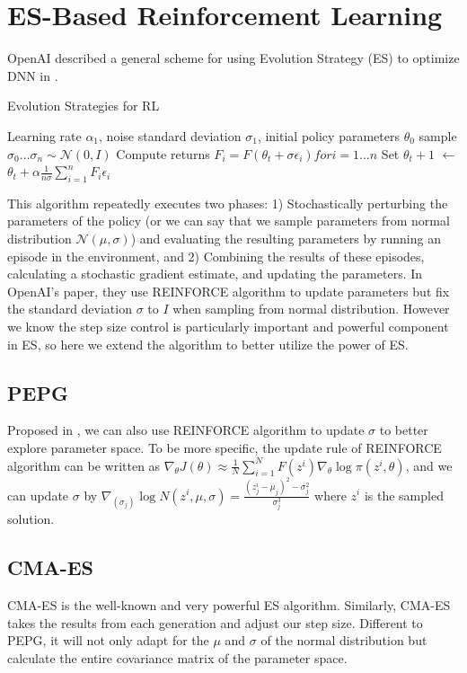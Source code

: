 \documentclass[a4paper]{article}
\newcommand*\Let[2]{\State #1 $\gets$ #2}
\begin{document}
\section{ES-Based Reinforcement Learning}
\label{sec:ESRL}

OpenAI described a general scheme for using Evolution Strategy (ES) to optimize DNN in \cite{openes/2017arXiv170303864S}.
\begin{algorithm}
	\caption{Evolution Strategies for RL \label{alg:ESRL}}
    \begin{algorithmic}[1]
	\Require Learning rate $\alpha_1$, noise standard deviation $\sigma_1$, initial policy parameters $\theta_0$
    	\State sample $\sigma_0 \dotsc \sigma_n \sim \mathcal{N}(0, I)$
        \State Compute returns $F_i = F(\theta_t + \sigma\epsilon_i) for i = 1 \dotsc n$
        \Let{Set $\theta_t+1$}{$\theta_t + \alpha\frac{1}{n\sigma}\sum_{i=1}^{n}F_i\epsilon_i$}
    \EndFor
	\end{algorithmic}
\end{algorithm}
This algorithm repeatedly executes two phases: 1) Stochastically perturbing the parameters of the policy (or we can say that we sample parameters from normal distribution $\mathcal{N}(\mu, \sigma)$) and evaluating the resulting parameters by running an episode in the environment, and 2) Combining the results of these episodes, calculating a stochastic gradient estimate, and updating the parameters. In OpenAI's paper, they use REINFORCE algorithm \cite{Williams:1992:SSG:139611.139614} to update parameters but fix the standard deviation $\sigma$ to $I$ when sampling from normal distribution. However we know the step size control is particularly important and powerful component in ES, so here we extend the algorithm to better utilize the power of ES.

\subsection{PEPG}
Proposed in \cite{PEPG}, we can also use REINFORCE algorithm to update $\sigma$ to better explore parameter space. To be more specific, the update rule of REINFORCE algorithm can be written as $\nabla_\theta J(\theta) \approx \frac{1}{N}\sum_{i=1}^{N}F(z^i)\nabla_\theta \log\pi(z^i, \theta)$, and we can update $\sigma$ by $\nabla_(\sigma_j) \log N(z^i, \mu, \sigma) = \frac{(z^i_j - \mu_j)^2 - \sigma^2_j}{\sigma^3_j}$ where $z^i$ is the sampled solution.

\subsection{CMA-ES}
CMA-ES \cite{Auger:2012:TCE:2330784.2330919} is the well-known and very powerful ES algorithm. Similarly, CMA-ES takes the results from each generation and adjust our step size. Different to PEPG, it will not only adapt for the $\mu$ and $\sigma$ of the normal distribution but calculate the entire covariance matrix of the parameter space.
\end{document}
